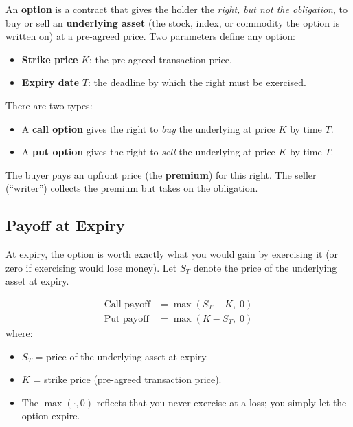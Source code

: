 \begin{definition}
An \textbf{option} is a contract that gives the holder the \emph{right, but not the obligation}, to buy or sell an \textbf{underlying asset} (the stock, index, or commodity the option is written on) at a pre-agreed price.
Two parameters define any option:
\begin{itemize}[nosep]
  \item \textbf{Strike price} $K$: the pre-agreed transaction price.
  \item \textbf{Expiry date} $T$: the deadline by which the right must be exercised.
\end{itemize}
\end{definition}

There are two types:
\begin{itemize}[nosep]
  \item A \textbf{call option} gives the right to \emph{buy} the underlying at price $K$ by time $T$.
  \item A \textbf{put option} gives the right to \emph{sell} the underlying at price $K$ by time $T$.
\end{itemize}

The buyer pays an upfront price (the \textbf{premium}) for this right.
The seller (``writer'') collects the premium but takes on the obligation.

\subsection{Payoff at Expiry}
\label{sec:option-payoff}

At expiry, the option is worth exactly what you would gain by exercising it (or zero if exercising would lose money).
Let $S_T$ denote the price of the underlying asset at expiry.

\begin{definition}
\begin{align}
  \text{Call payoff} &= \max(S_T - K,\; 0) \label{eq:call-payoff} \\
  \text{Put payoff}  &= \max(K - S_T,\; 0) \label{eq:put-payoff}
\end{align}
where:
\begin{itemize}[nosep]
  \item $S_T$ = price of the underlying asset at expiry.
  \item $K$ = strike price (pre-agreed transaction price).
  \item The $\max(\cdot, 0)$ reflects that you never exercise at a loss; you simply let the option expire.
\end{itemize}
\end{definition}

